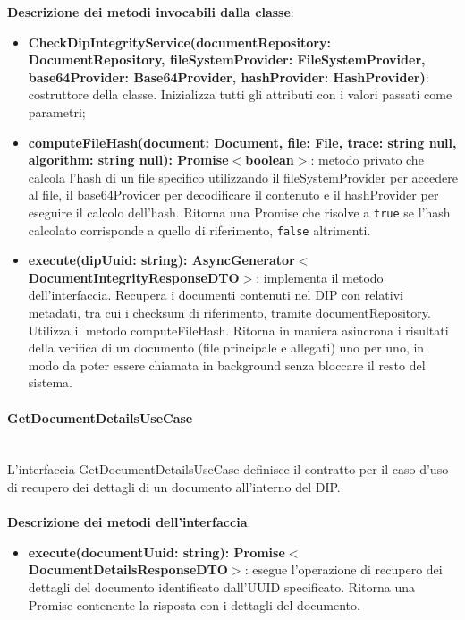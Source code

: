 \documentclass[a4paper,12pt]{article}
\begin{document}
{{{              \noindent \textbf{Descrizione dei metodi invocabili dalla classe}:
                \begin{itemize}
                    \item \textbf{CheckDipIntegrityService(documentRepository: DocumentRepository, fileSystemProvider: FileSystemProvider, base64Provider: Base64Provider, hashProvider: HashProvider)}: costruttore della classe. Inizializza tutti gli attributi con i valori passati come parametri;
                    \item \textbf{computeFileHash(document: Document, file: File, trace: string \textbar null, algorithm: string \textbar null): Promise$<$boolean$>$}: metodo privato che calcola l'hash di un file specifico utilizzando il fileSystemProvider per accedere al file, il base64Provider per decodificare il contenuto e il hashProvider per eseguire il calcolo dell'hash. Ritorna una Promise che risolve a \texttt{true} se l'hash calcolato corrisponde a quello di riferimento, \texttt{false} altrimenti.
                    \item \textbf{execute(dipUuid: string): AsyncGenerator$<$DocumentIntegrityResponseDTO$>$}: implementa il metodo dell'interfaccia. Recupera i documenti contenuti nel DIP con relativi metadati, tra cui i checksum di riferimento, tramite documentRepository. Utilizza il metodo computeFileHash. Ritorna in maniera asincrona i risultati della verifica di un documento (file principale e allegati) uno per uno, in modo da poter essere chiamata in background senza bloccare il resto del sistema.
                \end{itemize}
                \paragraph{GetDocumentDetailsUseCase}\label{par:GetDocumentDetailsUseCase}\mbox{}\\
                L'interfaccia GetDocumentDetailsUseCase definisce il contratto per il caso d'uso di recupero dei dettagli di un documento all'interno del DIP.\\
                \\
              \noindent \textbf{Descrizione dei metodi dell'interfaccia}:
                \begin{itemize}
                    \item \textbf{execute(documentUuid: string): Promise$<$DocumentDetailsResponseDTO$>$}: esegue l'operazione di recupero dei dettagli del documento identificato dall'UUID specificato. Ritorna una Promise contenente la risposta con i dettagli del documento.
                \end{itemize}
}}}
\end{document}
